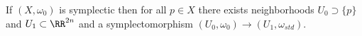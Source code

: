 
If $(X,  \omega_0)$ is symplectic then for all $p\in X$ there exists neighborhoods $U_0\supset \{p\}$ and $U_1\subset \RR^{2n}$ and a symplectomorphism $(U_0,  \omega_0)\to (U_1,  \omega_{std})$.